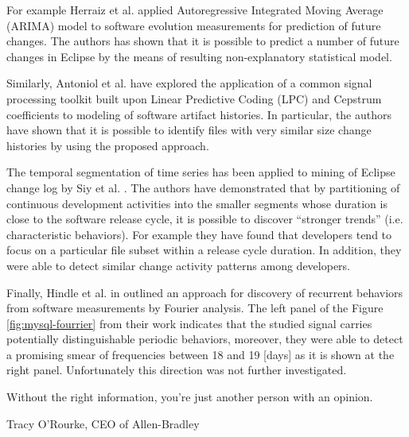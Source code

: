 For example Herraiz et al. \cite{citeulike:6544685} applied Autoregressive Integrated Moving Average (ARIMA) model 
to software evolution measurements for prediction of future changes. The authors has shown that it is possible to 
predict a number of future changes in Eclipse by the means of resulting non-explanatory statistical model. 

Similarly, Antoniol et al. \cite{citeulike:3378725} have explored the application of a common signal processing toolkit 
built upon Linear Predictive Coding (LPC) and Cepstrum coefficients to modeling of software artifact histories. 
In particular, the authors have shown that it is possible to identify files with very similar size change histories 
by using the proposed approach.

The temporal segmentation of time series has been applied to mining of Eclipse change log by Siy et al. \cite{citeulike:10896305}.
The authors have demonstrated that by partitioning of continuous development activities into the smaller segments whose duration 
is close to the software release cycle, it is possible to discover ``stronger trends'' (i.e. characteristic behaviors). 
For example they have found that developers tend to focus on a particular file subset within a release cycle duration. 
In addition, they were able to detect similar change activity patterns among developers.

Finally, Hindle et al. in \cite{citeulike:10377345} outlined an approach for discovery of recurrent behaviors from software 
measurements by Fourier analysis. 
The left panel of the Figure \ref{fig:mysql-fourrier} from their work indicates that the studied signal carries potentially 
distinguishable periodic behaviors, moreover, they were able to detect a promising smear of frequencies between 18 and 19 
[days] as it is shown at the right panel. Unfortunately this direction was not further investigated.

\epigraph{Without the right information, you're just another person with an opinion.}{Tracy O'Rourke, CEO of Allen-Bradley}